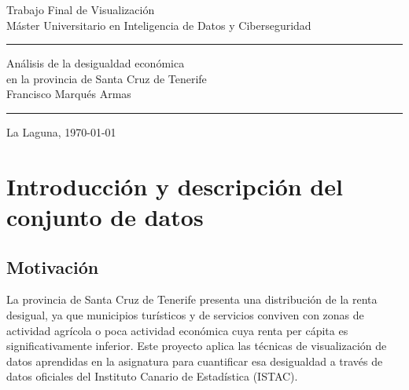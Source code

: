 \documentclass[spanish,a4paper,12pt,oneside]{extreport}
\begin{document}
\renewcommand\listtablename{Índice de Tablas}
\renewcommand\listfigurename{Índice de Figuras}

\pagestyle{empty}
\thispagestyle{empty}

\newcommand{\HRule}{\rule{\linewidth}{1mm}}
\setlength{\parindent}{0mm}
\setlength{\parskip}{0mm}


\begin{center}
  {\Huge Trabajo Final de Visualización}\\[5mm]
  {\large Máster Universitario en Inteligencia de Datos y Ciberseguridad}
\end{center}

\HRule
\begin{flushright}
        {\Huge Análisis de la desigualdad económica\\en la provincia de Santa Cruz de Tenerife} \\[2.5mm]
        {\Large Francisco Marqués Armas} \\[5mm]
\end{flushright}
\HRule
{}
\begin{center}
  \Large La Laguna, \today
\end{center}

\setlength{\parindent}{5mm}

\pagestyle{plain}

\setcounter{tocdepth}{2}
\tableofcontents

\newpage
{}
\pagestyle{plain}


\chapter{Introducción y descripción del conjunto de datos}

\section{Motivación}

La provincia de Santa Cruz de Tenerife presenta una distribución de la renta desigual, ya que municipios turísticos y de servicios conviven con zonas de actividad agrícola o poca actividad económica cuya renta per cápita es significativamente inferior. Este proyecto aplica las técnicas de visualización de datos aprendidas en la asignatura para cuantificar esa desigualdad a través de datos oficiales del Instituto Canario de Estadística (ISTAC).
\end{document}
